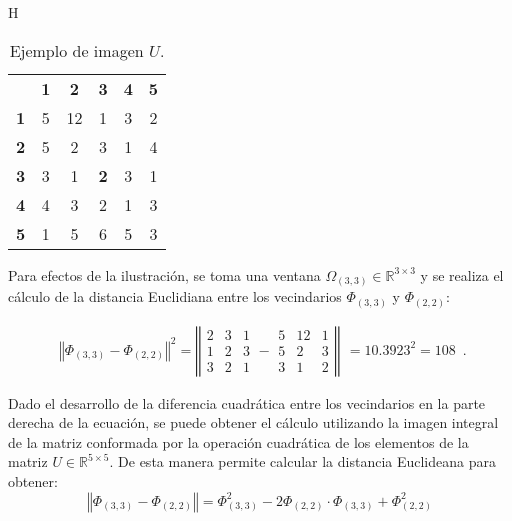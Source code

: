 \begin{table}{H}
\begin{center}
\caption{Ejemplo de imagen $U$.}

\renewcommand{\arraystretch}{1.4}
\setlength\tabcolsep{3pt}

{
\begin{tabular}{cc|ccc|c}
 & \multicolumn{1}{c}{\textbf{1}} & \textbf{2} & \textbf{3} & \multicolumn{1}{c}{\textbf{4}} & \textbf{5}\tabularnewline
\textbf{1} & \multicolumn{1}{c}{5} & 12 & 1 & \multicolumn{1}{c}{3} & 2\tabularnewline
\cline{3-5} 
\textbf{2} & 5 & 2 & 3 & 1 & 4\tabularnewline
\textbf{3} & 3 & 1 & \textbf{2} & 3 & 1\tabularnewline
\textbf{4} & 4 & 3 & 2 & 1 & 3\tabularnewline
\cline{3-5} 
\textbf{5} & \multicolumn{1}{c}{1} & 5 & 6 & \multicolumn{1}{c}{5} & 3\tabularnewline
\end{tabular}
}
\par\end{center} \label{tab_ImageExample}
\end{table}




Para efectos de la ilustraci\'on, se toma una ventana $\Omega_{\left(3,3\right)}\in\mathbb{R}^{3\times3}$  y se realiza  el c\'alculo de la distancia Euclidiana entre los vecindarios $\varPhi_{\left(3,3\right)}$ y $\varPhi_{\left(2,2\right)}$:

\begin{equation}
\label{eq:resultado1}
\begin{array}{c}
\left\Vert \varPhi_{\left(3,3\right)}-\varPhi_{\left(2,2\right)}\right\Vert ^{2}=\left\Vert \begin{array}{ccc}
2 & 3 & 1\\
1 & 2 & 3\\
3 & 2 & 1
\end{array}-\begin{array}{ccc}
5 & 12 & 1\\
5 & 2 & 3\\
3 & 1 & 2
\end{array}\right\Vert\end{array}
=10.3923^{2}=108 \enspace .
\end{equation}



 Dado el desarrollo de la diferencia cuadr\'atica entre los vecindarios en la parte derecha de la ecuaci\'on, se puede obtener el c\'alculo utilizando la imagen integral de la matriz conformada por la operaci\'on cuadr\'atica de los elementos de la matriz $U\in\mathbb{R}^{5\times5}$. De esta manera permite calcular la distancia Euclideana para obtener: 
\begin{equation}
\left\Vert \varPhi_{\left(3,3\right)}-\varPhi_{\left(2,2\right)}\right\Vert =\varPhi_{\left(3,3\right)}^{2}-2\varPhi_{\left(2,2\right)}\cdot\varPhi_{\left(3,3\right)}+\varPhi_{\left(2,2\right)}^{2} 
\end{equation}


